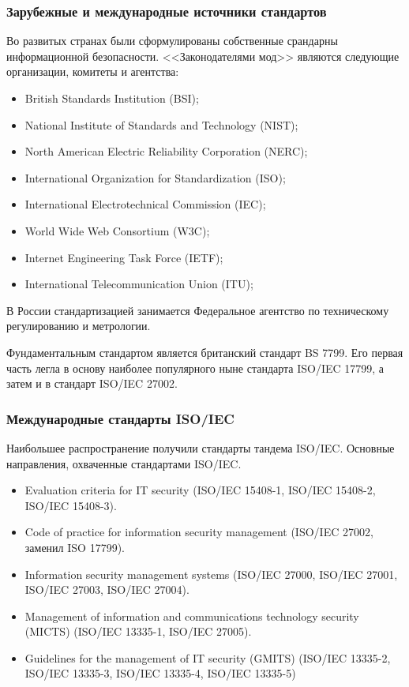 \begin{frame}
\frametitle{Зарубежные и международные источники стандартов}
Во развитых странах были сформулированы собственные срандарны информационной безопасности. <<Законодателями мод>> являются следующие организации, комитеты и агентства:
\begin{itemize}
    \item British Standards Institution (BSI);
    \item National Institute of Standards and Technology (NIST);
    \item North American Electric Reliability Corporation (NERC);
    \item International Organization for Standardization (ISO);
    \item International Electrotechnical Commission (IEC);
    \item World Wide Web Consortium (W3C);
    \item Internet Engineering Task Force (IETF);
    \item International Telecommunication Union (ITU);
\end{itemize}
В России стандартизацией занимается Федеральное агентство по техническому регулированию и метрологии.
\end{frame}


Фундаментальным стандартом является британский стандарт BS 7799. Его первая часть легла в основу наиболее популярного ныне стандарта ISO/IEC 17799, а затем и в стандарт ISO/IEC 27002.


\begin{frame}
\frametitle{Международные стандарты ISO/IEC}
Наибольшее распространение получили стандарты тандема ISO/IEC. Основные направления, охваченные стандартами ISO/IEC.
\begin{itemize}
    \item Evaluation criteria for IT security (\alert{ISO/IEC 15408-1, ISO/IEC 15408-2, ISO/IEC 15408-3}).
    \item Code of practice for information security management (\alert{ISO/IEC 27002, заменил ISO 17799}).
    \item Information security management systems (\alert{ISO/IEC 27000, ISO/IEC 27001, ISO/IEC 27003, ISO/IEC 27004}).
    \item Management of information and communications technology security (MICTS) (\alert{ISO/IEC 13335-1, ISO/IEC 27005}).
    \item Guidelines for the management of IT security (GMITS) (\alert{ISO/IEC 13335-2, ISO/IEC 13335-3, ISO/IEC 13335-4, ISO/IEC 13335-5})
\end{itemize}
\end{frame}


